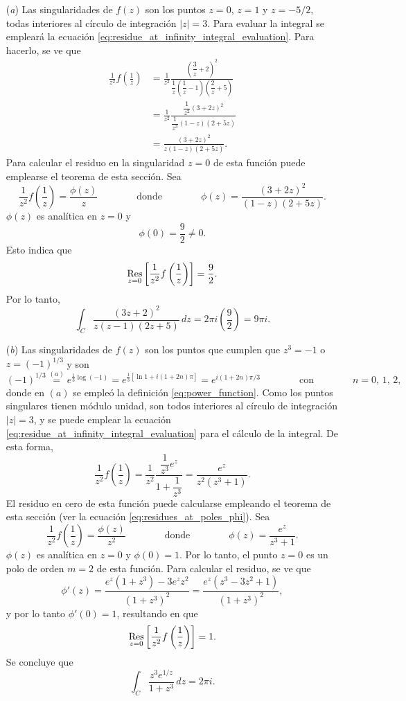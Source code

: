 \documentclass[a4paper]{report}
\def\Res{\qopname\relax m{Res}}
\begin{document}
\begin{enumerate}
 \item[(\textit{a})] Las singularidades de \(f(z)\) son los puntos \(z=0\), \(z=1\) y \(z=-5/2\), todas interiores al círculo de integración \(|z|=3\). Para evaluar la integral se empleará la ecuación \ref{eq:residue_at_infinity_integral_evaluation}. Para hacerlo, se ve que 
 \begin{align*}
  \frac{1}{z^2}f\left(\frac{1}{z}\right)&=\frac{1}{z^2}\frac{\left(\dfrac{3}{z}+2\right)^2}{\dfrac{1}{z}\left(\dfrac{1}{z}-1\right)\left(\dfrac{2}{z}+5\right)}\\
   &=\frac{1}{z^2}\frac{\dfrac{1}{z^2}(3+2z)^2}{\dfrac{1}{z^3}(1-z)(2+5z)}\\
   &=\frac{(3+2z)^2}{z(1-z)(2+5z)}.
 \end{align*}
 Para calcular el residuo en la singularidad \(z=0\) de esta función puede emplearse el teorema de esta sección. Sea 
 \[
   \frac{1}{z^2}f\left(\frac{1}{z}\right)=\frac{\phi(z)}{z}
   \qquad\qquad\textrm{donde}\qquad\qquad
   \phi(z)=\frac{(3+2z)^2}{(1-z)(2+5z)}.
 \]
 \(\phi(z)\) es analítica en \(z=0\) y 
 \[
  \phi(0)=\frac{9}{2}\neq0.
 \]
 Esto indica que 
 \[
  \Res_{z=0}\left[\frac{1}{z^2}f\left(\frac{1}{z}\right)\right]=\frac{9}{2}.
 \]
 Por lo tanto,
 \[
  \int_C\frac{(3z+2)^2}{z(z-1)(2z+5)}\,dz=2\pi i\left(\frac{9}{2}\right)=9\pi i.
 \]
 \item[(\textit{b})] Las singularidades de \(f(z)\) son los puntos que cumplen que \(z^3=-1\) o \(z=(-1)^{1/3}\) y son
 \[
  (-1)^{1/3}\overset{(a)}{=}e^{\frac{1}{3}\log(-1)}=e^{\frac{1}{3}[\ln1+i(1+2n)\pi]}=e^{i(1+2n)\pi/3}
  \qquad\qquad\textrm{con}\qquad\qquad
  n=0,\,1,\,2,
 \]
 donde en \((a)\) se empleó la definición \ref{eq:power_function}. Como los puntos singulares tienen módulo unidad, son todos interiores al círculo de integración \(|z|=3\), y se puede emplear la ecuación  \ref{eq:residue_at_infinity_integral_evaluation} para el cálculo de la integral. De esta forma,
 \[
  \frac{1}{z^2}f\left(\frac{1}{z}\right)=\frac{1}{z^2}\frac{\dfrac{1}{z^3}e^{z}}{1+\dfrac{1}{z^3}}=\frac{e^{z}}{z^2(z^3+1)}.
 \]
 El residuo en cero de esta función puede calcularse empleando el teorema de esta sección (ver la ecuación \ref{eq:residues_at_poles_phi}). Sea 
 \[
  \frac{1}{z^2}f\left(\frac{1}{z}\right)=\frac{\phi(z)}{z^2}
  \qquad\qquad\textrm{donde}\qquad\qquad
   \phi(z)=\frac{e^z}{z^3+1}.
 \]
 \(\phi(z)\) es analítica en \(z=0\) y \(\phi(0)=1\). Por lo tanto, el punto \(z=0\) es un polo de orden \(m=2\) de esta función. Para calcular el residuo, se ve que 
 \[
  \phi'(z)=\frac{e^z(1+z^3)-3e^zz^2}{(1+z^3)^2}=\frac{e^z(z^3-3z^2+1)}{(1+z^3)^2},
 \]
 y por lo tanto \(\phi'(0)=1\), resultando en que 
 \[
  \Res_{z=0}\left[\frac{1}{z^2}f\left(\frac{1}{z}\right)\right]=1.
 \] 
 Se concluye que 
 \[
  \int_C\frac{z^3e^{1/z}}{1+z^3}\,dz=2\pi i.
 \] 
\end{enumerate} 
\end{document}
